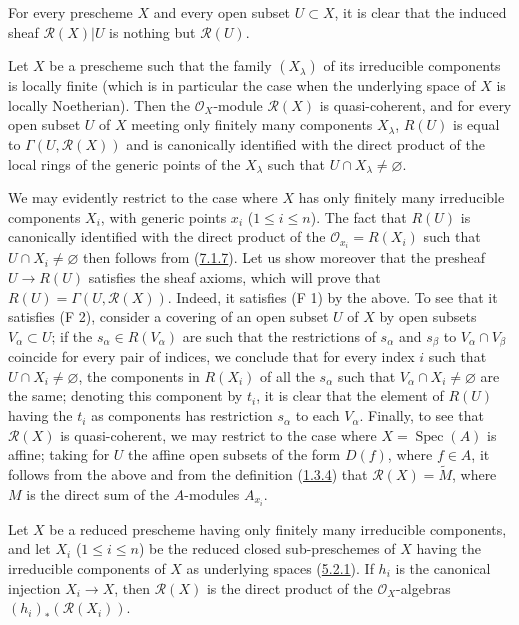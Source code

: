 For every prescheme $X$ and every open subset $U\subset X$, it is clear that the
induced sheaf $\mathscr{R}(X)|U$ is nothing but $\mathscr{R}(U)$.

\begin{proposition}[7.3.3]
\label{I.7.3.3}
Let $X$ be a prescheme such that the family $(X_\lambda)$ of its irreducible
components is locally finite (which is in particular the case when the
underlying space of $X$ is locally Noetherian). Then the
$\mathscr{O}_X$-module $\mathscr{R}(X)$ is quasi-coherent, and for every open
subset $U$ of $X$ meeting only finitely many components $X_\lambda$,
$R(U)$ is equal to $\Gamma(U,\mathscr{R}(X))$ and is canonically identified
with the direct product of the local rings of the generic points of the
$X_\lambda$ such that $U\cap X_\lambda\neq\varnothing$.
\end{proposition}

We may evidently restrict to the case where $X$ has only finitely many
irreducible components $X_i$, with generic points $x_i$
($1\leq i\leq n$). The fact that $R(U)$ is canonically identified with the
direct product of the $\mathscr{O}_{x_i}=R(X_i)$ such that
$U\cap X_i\neq\varnothing$ then follows from
(\hyperref[I.7.1.7]{7.1.7}). Let us show moreover that the presheaf
$U\to R(U)$ satisfies the sheaf axioms, which will prove that
$R(U)=\Gamma(U,\mathscr{R}(X))$. Indeed, it satisfies (F 1) by the above. To
see that it satisfies (F 2), consider a covering of an open subset $U$ of $X$
by open subsets $V_\alpha\subset U$; if the $s_\alpha\in R(V_\alpha)$ are such
that the restrictions of $s_\alpha$ and $s_\beta$ to $V_\alpha\cap V_\beta$
coincide for every pair of indices, we conclude that for every index $i$ such
that $U\cap X_i\neq\varnothing$, the components in $R(X_i)$ of all the
$s_\alpha$ such that $V_\alpha\cap X_i\neq\varnothing$ are the same; denoting
this component by $t_i$, it is clear that the element of $R(U)$ having the
$t_i$ as components has restriction $s_\alpha$ to each $V_\alpha$. Finally, to
see that $\mathscr{R}(X)$ is quasi-coherent, we may restrict to the case where
$X=\operatorname{Spec}(A)$ is affine; taking for $U$ the affine open subsets
of the form $D(f)$, where $f\in A$, it follows from the above and from the
definition (\hyperref[I.1.3.4]{1.3.4}) that
$\mathscr{R}(X)=\widetilde M$, where $M$ is the direct sum of the $A$-modules
$A_{x_i}$.

\begin{corollary}[7.3.4]
\label{I.7.3.4}
Let $X$ be a reduced prescheme having only finitely many irreducible
components, and let $X_i$ ($1\leq i\leq n$) be the reduced closed
sub-preschemes of $X$ having the irreducible components of $X$ as underlying
spaces (\hyperref[I.5.2.1]{5.2.1}). If $h_i$ is the canonical injection
$X_i\to X$, then $\mathscr{R}(X)$ is the direct product of the
$\mathscr{O}_X$-algebras $(h_i)_*(\mathscr{R}(X_i))$.
\end{corollary}

